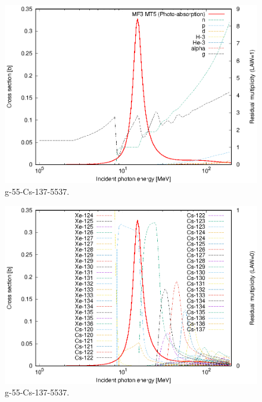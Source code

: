 \begin{figure}
 \includegraphics[width=\linewidth]{eps/g_55-Cs-137_5537.eps}
  \caption{g-55-Cs-137-5537.}
\end{figure}
\begin{figure}
 \includegraphics[width=\linewidth]{eps-law0/g_55-Cs-137_5537.eps}
 \caption{g-55-Cs-137-5537.}
\end{figure}
\newpage \clearpage

